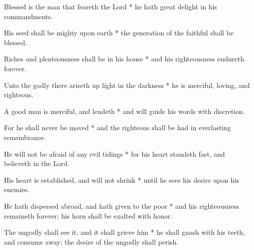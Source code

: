\begin{multicols}{2}
	
	Blessed is the man that feareth the Lord * he hath great delight in his commandments.
	
	His seed shall be mighty upon earth * the generation of the faithful shall be blessed.
	
	Riches and plenteousness shall be in his house * and his righteousness endureth forever.
	
	Unto the godly there ariseth up light in the darkness * he is merciful, loving, and righteous.
	
	A good man is merciful, and lendeth * and will guide his words with discretion.
	
	For he shall never be moved * and the righteous shall be had in everlasting remembrance.
	
	He will not be afraid of any evil tidings * for his heart standeth fast, and believeth in the Lord.

	His heart is established, and will not shrink * until he sees his desire upon his enemies.
	
	He hath dispersed abroad, and hath given to the poor * and his righteousness remaineth forever; his horn shall be exalted with honor.
	
	The ungodly shall see it, and it shall grieve him * he shall gnash with his teeth, and consume away; the desire of the ungodly shall perish.
		
	\gloria{}
\end{multicols}